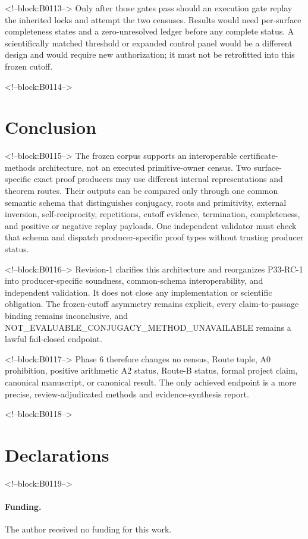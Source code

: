 \documentclass[11pt,a4paper]{article}
\begin{document}
<!--block:B0113-->
Only after those gates pass should an execution gate replay the inherited locks and attempt the two censuses. Results would need per-surface completeness states and a zero-unresolved ledger before any complete status. A scientifically matched threshold or expanded control panel would be a different design and would require new authorization; it must not be retrofitted into this frozen cutoff.

<!--block:B0114-->
\hypertarget{conclusion}{%
\section{Conclusion}\label{conclusion}}

<!--block:B0115-->
The frozen corpus supports an interoperable certificate-methods architecture, not an executed primitive-owner census. Two surface-specific exact proof producers may use different internal representations and theorem routes. Their outputs can be compared only through one common semantic schema that distinguishes conjugacy, roots and primitivity, external inversion, self-reciprocity, repetitions, cutoff evidence, termination, completeness, and positive or negative replay payloads. One independent validator must check that schema and dispatch producer-specific proof types without trusting producer status.

<!--block:B0116-->
Revision-1 clarifies this architecture and reorganizes P33-RC-1 into producer-specific soundness, common-schema interoperability, and independent validation. It does not close any implementation or scientific obligation. The frozen-cutoff asymmetry remains explicit, every claim-to-passage binding remains inconclusive, and NOT\_EVALUABLE\_CONJUGACY\_METHOD\_UNAVAILABLE remains a lawful fail-closed endpoint.

<!--block:B0117-->
Phase 6 therefore changes no census, Route tuple, A0 prohibition, positive arithmetic A2 status, Route-B status, formal project claim, canonical manuscript, or canonical result. The only achieved endpoint is a more precise, review-adjudicated methods and evidence-synthesis report.

<!--block:B0118-->
\section*{Declarations}

<!--block:B0119-->
\paragraph{Funding.}
The author received no funding for this work.
\end{document}
